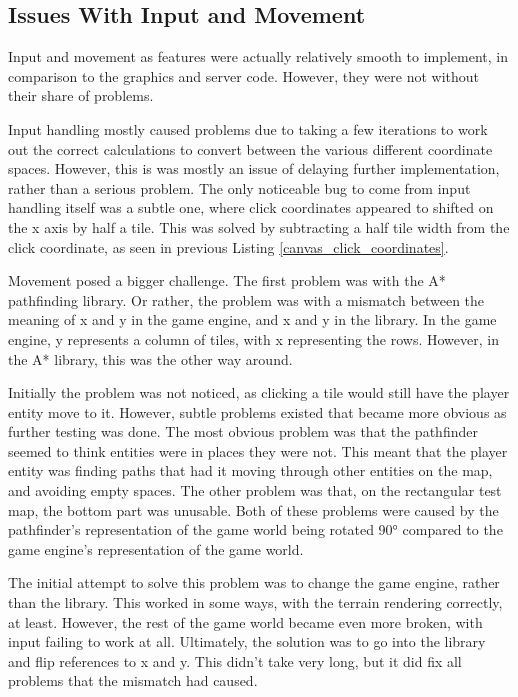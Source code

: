 \subsection{Issues With Input and Movement}
Input and movement as features were actually relatively smooth to implement, in comparison to the graphics and server code. However, they were not without their share of problems.

Input handling mostly caused problems due to taking a few iterations to work out the correct calculations to convert between the various different coordinate spaces. However, this is was mostly an issue of delaying further implementation, rather than a serious problem. The only noticeable bug to come from input handling itself was a subtle one, where click coordinates appeared to shifted on the x axis by half a tile. This was solved by subtracting a half tile width from the click coordinate, as seen in previous Listing \ref{canvas_click_coordinates}.

Movement posed a bigger challenge. The first problem was with the A* pathfinding library. Or rather, the problem was with a mismatch between the meaning of x and y in the game engine, and x and y in the library. In the game engine, y represents a column of tiles, with x representing the rows. However, in the A* library, this was the other way around.

Initially the problem was not noticed, as clicking a tile would still have the player entity move to it. However, subtle problems existed that became more obvious as further testing was done. The most obvious problem was that the pathfinder seemed to think entities were in places they were not. This meant that the player entity was finding paths that had it moving through other entities on the map, and avoiding empty spaces. The other problem was that, on the rectangular test map, the bottom part was unusable. Both of these problems were caused by the pathfinder's representation of the game world being rotated 90° compared to the game engine's representation of the game world.

The initial attempt to solve this problem was to change the game engine, rather than the library. This worked in some ways, with the terrain rendering correctly, at least. However, the rest of the game world became even more broken, with input failing to work at all. Ultimately, the solution was to go into the library and flip references to x and y. This didn't take very long, but it did fix all problems that the mismatch had caused.

